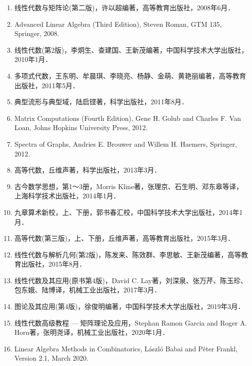 \documentclass[a4paper,fontset=windows]{ctexbook}
\theoremstyle{definition}
\begin{document}
\begin{enumerate}
\item 线性代数与矩阵论(第二版)，许以超编著，高等教育出版社，2008年6月．

\item Advanced Linear Algebra (Third Edition), Steven Roman, GTM 135, Springer, 2008.

\item 线性代数(第2版)，李炯生、查建国、王新茂编著，中国科学技术大学出版社，2010年1月．

\item 多项式代数，王东明、牟晨琪、李晓亮、杨静、金萌、黄艳丽编著，高等教育出版社，2011年5月．

\item 典型流形与典型域，陆启铿著，科学出版社，2011年8月．

\item Matrix Computations (Fourth Edition), Gene H. Golub and Charles F. Van Loan, Johns Hopkins University Press, 2012.

\item Spectra of Graphs, Andries E. Brouwer and Willem H. Haemers, Springer, 2012.

\item 高等代数，丘维声著，科学出版社，2013年3月．

\item 古今数学思想，第1～3册，Morris Kline著，张理京、石生明、邓东皋等译，上海科学技术出版社，2014年1月．

\item 九章算术新校，上、下册，郭书春汇校，中国科学技术大学出版社，2014年1月．

\item 高等代数(第三版)，上、下册，丘维声著，高等教育出版社，2015年3月．

\item 线性代数与解析几何(第2版)，陈发来、陈效群、李思敏、王新茂编著，高等教育出版社，2015年8月．

\item 线性代数及其应用(原书第4版)，David C. Lay著，刘深泉、张万芹、陈玉珍、包东娥、陆博译，机械工业出版社，2017年3月．

\item 图论及其应用(第4版)，徐俊明编著，中国科学技术大学出版社，2019年3月．

\item 线性代数高级教程 — 矩阵理论及应用，Stephan Ramon Garcia and Roger A. Horn著，张明尧译，机械工业出版社，2020年1月．

\item Linear Algebra Methods in Combinatorics, L\'aszl\'o Babai and P\'eter Frankl, Version 2.1, March 2020.
\end{enumerate}
\end{document}
